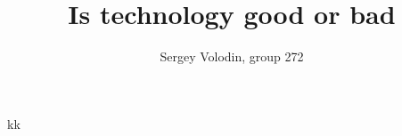 \documentclass[a4paper]{article}
\author{Sergey Volodin, group 272}
\title{Is technology good or bad}
\begin{document}
\maketitle
\begin{thebibliography}{widestlabel}
 kk
\end{thebibliography}
\end{document}
